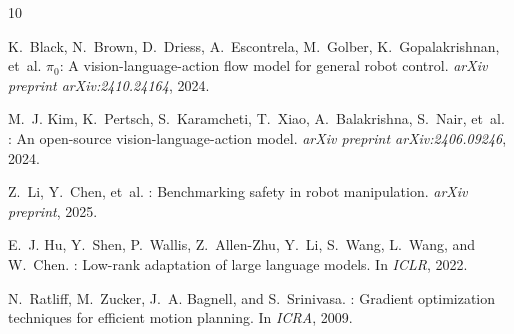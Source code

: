 \documentclass[letterpaper]{article}
\begin{document}



\begin{thebibliography}{10}

K.~Black, N.~Brown, D.~Driess, A.~Escontrela, M.~Golber, K.~Gopalakrishnan, et~al.
\newblock $\pi_0$: A vision-language-action flow model for general robot control.
\newblock \emph{arXiv preprint arXiv:2410.24164}, 2024.

M.~J. Kim, K.~Pertsch, S.~Karamcheti, T.~Xiao, A.~Balakrishna, S.~Nair, et~al.
: An open-source vision-language-action model.
\newblock \emph{arXiv preprint arXiv:2406.09246}, 2024.

Z.~Li, Y.~Chen, et~al.
: Benchmarking safety in robot manipulation.
\newblock \emph{arXiv preprint}, 2025.

E.~J. Hu, Y.~Shen, P.~Wallis, Z.~Allen-Zhu, Y.~Li, S.~Wang, L.~Wang, and W.~Chen.
: Low-rank adaptation of large language models.
\newblock In \emph{ICLR}, 2022.

N.~Ratliff, M.~Zucker, J.~A. Bagnell, and S.~Srinivasa.
: Gradient optimization techniques for efficient motion planning.
\newblock In \emph{ICRA}, 2009.

\end{thebibliography}
\end{document}
